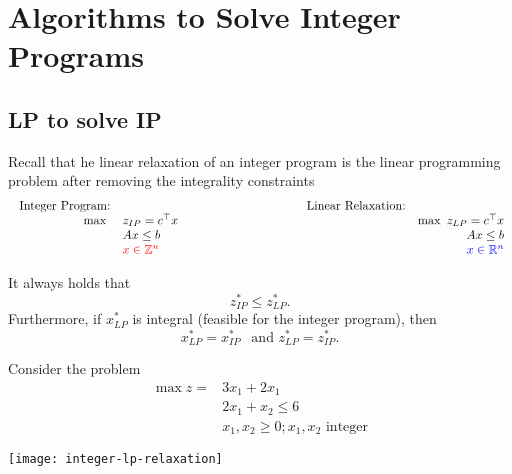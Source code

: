 \documentclass[../open-optimization/open-optimization.tex]{subfiles}
\begin{document}
\chapter{Algorithms to Solve Integer Programs}
\label{sec:IP-algorithms}
\section{LP to solve IP}

Recall that he linear relaxation of an integer program is the linear programming problem after removing the integrality constraints
$$
\begin{array}{rlclr}
\text{ Integer Program:} & & & \text{Linear Relaxation:}\\
\max \ & z_{IP} = c^\top x & \hspace{3cm} & & \max \  z_{LP} = c^\top x \\
& Ax \leq b & & & Ax \leq b\\
& \tred{x \in \Z^n} & & & \tblue{x \in \R^n}
\end{array}
$$

\begin{theorem}
It always holds that 
\begin{equation}
z^*_{IP} \leq z^*_{LP}.
\end{equation}
Furthermore, if $x^*_{LP}$ is integral (feasible for the integer program), then 
\begin{equation}
x^*_{LP} = x^*_{IP} \ \ \text{ and } z^*_{LP} = z^*_{IP}.
\end{equation}
\end{theorem}

\begin{example}

%
\begin{minipage}[t]{0.5\textwidth}
Consider the problem 
\begin{align*}
\max z = & 3x_1 + 2x_1\\
& 2x_1 + x_2 \leq 6\\
& x_1, x_2 \geq 0; x_1, x_2 \text{ integer}
\end{align*}
\end{minipage}
%
\begin{minipage}[t]{0.4\textwidth}
\texttt{[image: integer-lp-relaxation]}
\end{minipage}
\end{example}
\end{document}
